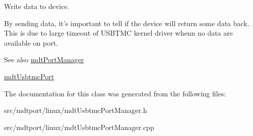 Write data to device. 

By sending data, it's important to tell if the device will return some data back. This is due to large timeout of USBTMC kernel driver whenn no data are available on port. \begin{DoxySeeAlso}{See also}
\hyperlink{classmdt_port_manager}{mdtPortManager} 

\hyperlink{classmdt_usbtmc_port}{mdtUsbtmcPort} 
\end{DoxySeeAlso}


The documentation for this class was generated from the following files:\begin{DoxyCompactItemize}
\item 
src/mdtport/linux/mdtUsbtmcPortManager.h\item 
src/mdtport/linux/mdtUsbtmcPortManager.cpp\end{DoxyCompactItemize}
